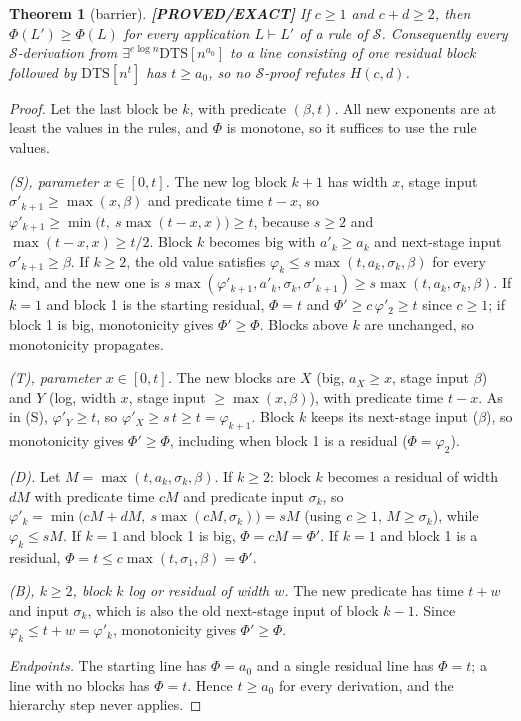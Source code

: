 \documentclass[11pt]{article}
\newtheorem{theorem}{Theorem}
\theoremstyle{definition}
\theoremstyle{remark}
\newcommand{\DTS}{\mathrm{DTS}}
\newcommand{\status}[1]{\textbf{[#1]}}
\begin{document}
\begin{theorem}[barrier]\label{thm:barrier} \status{PROVED/EXACT}
If $c\ge1$ and $c+d\ge2$, then $\Phi(L')\ge\Phi(L)$ for every application $L\vdash L'$ of a rule of
$\mathcal S$. Consequently every $\mathcal S$-derivation from $\exists^{e\log n}\DTS[n^{a_0}]$ to a line consisting
of one residual block followed by $\DTS[n^t]$ has $t\ge a_0$, so no $\mathcal S$-proof refutes $H(c,d)$.
\end{theorem}
\begin{proof}
Let the last block be $k$, with predicate $(\beta,t)$. All new exponents are at least the values in the
rules, and $\Phi$ is monotone, so it suffices to use the rule values.

\emph{(S), parameter $x\in[0,t]$.} The new log block $k+1$ has width $x$, stage input
$\sigma'_{k+1}\ge\max(x,\beta)$ and predicate time $t-x$, so
$\varphi'_{k+1}\ge\min\bigl(t,\ s\max(t-x,x)\bigr)\ge t$, because $s\ge2$ and $\max(t-x,x)\ge t/2$.
Block $k$ becomes big with $a'_k\ge a_k$ and next-stage input $\sigma'_{k+1}\ge\beta$. If $k\ge2$, the old
value satisfies $\varphi_k\le s\max(t,a_k,\sigma_k,\beta)$ for every kind, and the new one is
$s\max(\varphi'_{k+1},a'_k,\sigma_k,\sigma'_{k+1})\ge s\max(t,a_k,\sigma_k,\beta)$. If $k=1$ and block 1 is
the starting residual, $\Phi=t$ and $\Phi'\ge c\,\varphi'_2\ge t$ since $c\ge1$; if block 1 is big,
monotonicity gives $\Phi'\ge\Phi$. Blocks above $k$ are unchanged, so monotonicity propagates.

\emph{(T), parameter $x\in[0,t]$.} The new blocks are $X$ (big, $a_X\ge x$, stage input $\beta$) and
$Y$ (log, width $x$, stage input $\ge\max(x,\beta)$), with predicate time $t-x$. As in (S),
$\varphi'_Y\ge t$, so $\varphi'_X\ge s\,t\ge t=\varphi_{k+1}$. Block $k$ keeps its next-stage input
($\beta$), so monotonicity gives $\Phi'\ge\Phi$, including when block 1 is a residual ($\Phi=\varphi_2$).

\emph{(D).} Let $M=\max(t,a_k,\sigma_k,\beta)$. If $k\ge2$: block $k$ becomes a residual of width $dM$
with predicate time $cM$ and predicate input $\sigma_k$, so
$\varphi'_k=\min\bigl(cM+dM,\ s\max(cM,\sigma_k)\bigr)=sM$ (using $c\ge1$, $M\ge\sigma_k$), while
$\varphi_k\le sM$. If $k=1$ and block 1 is big, $\Phi=cM=\Phi'$. If $k=1$ and block 1 is a residual,
$\Phi=t\le c\max(t,\sigma_1,\beta)=\Phi'$.

\emph{(B), $k\ge2$, block $k$ log or residual of width $w$.} The new predicate has time $t+w$ and input
$\sigma_k$, which is also the old next-stage input of block $k-1$. Since
$\varphi_k\le t+w=\varphi'_k$, monotonicity gives $\Phi'\ge\Phi$.

\emph{Endpoints.} The starting line has $\Phi=a_0$ and a single residual line has $\Phi=t$; a line with no
blocks has $\Phi=t$. Hence $t\ge a_0$ for every derivation, and the hierarchy step never applies.
\end{proof}
\end{document}
